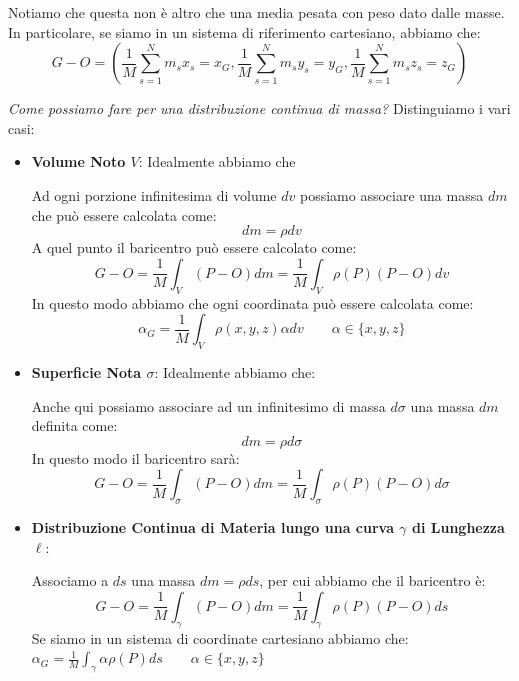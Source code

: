 \documentclass[11pt,a4paper,twoside]{article}
\theoremstyle{definition}
\begin{document}
Notiamo che questa non è altro che una media pesata con peso dato dalle masse.\\
In particolare, se siamo in un sistema di riferimento cartesiano, abbiamo che:
\[ G-O = \left( \frac 1M \sum_{s = 1}^N m_sx_s = x_G, \frac 1M \sum_{s = 1}^N m_sy_s = y_G, \frac 1M \sum_{s = 1}^N m_sz_s = z_G\right) \]

\textit{Come possiamo fare per una distribuzione continua di massa?} Distinguiamo i vari casi:
\begin{itemize}
	\item \textbf{Volume Noto $V$}: Idealmente abbiamo che
		\begin{center}
		\end{center}
		Ad ogni porzione infinitesima di volume $dv$ possiamo associare una massa $dm$ che può essere calcolata come:
		\[ dm = \rho dv \]
		A quel punto il baricentro può essere calcolato come:
		\[ G-O = \frac 1M \int_V(P-O)dm = \frac 1M \int_V \rho(P)(P-O)dv \]
		In questo modo abbiamo che ogni coordinata può essere calcolata come:
		\[ \alpha_G = \frac 1M \int_V \rho (x, y, z)\alpha dv \qquad \alpha \in \{x,y,z\}\]
	\item \textbf{Superficie Nota $\sigma$}: Idealmente abbiamo che:
		\begin{center}
		\end{center}
		Anche qui possiamo associare ad un infinitesimo di massa $d \sigma$ una massa $dm$ definita come:
		\[ dm = \rho d\sigma \]
		In questo modo il baricentro sarà:
		\[ G-O = \frac 1M \int_\sigma (P-O)dm = \frac 1M \int_\sigma \rho(P)(P-O)d\sigma \]
	\item \textbf{Distribuzione Continua di Materia lungo una curva $\gamma$ di Lunghezza $\ell$}:
		\begin{center}
		\end{center}
		Associamo a $ds$ una massa $dm = \rho ds$, per cui abbiamo che il baricentro è:
		\[ G-O = \frac 1M \int_\gamma(P-O) dm = \frac 1M\int_\gamma \rho(P)(P-O)ds \]
		Se siamo in un sistema di coordinate cartesiano abbiamo che:
		$\alpha_G = \frac 1M \int_\gamma \alpha \rho(P)ds \qquad \alpha \in \{x,y,z\}$
\end{itemize}
\end{document}

